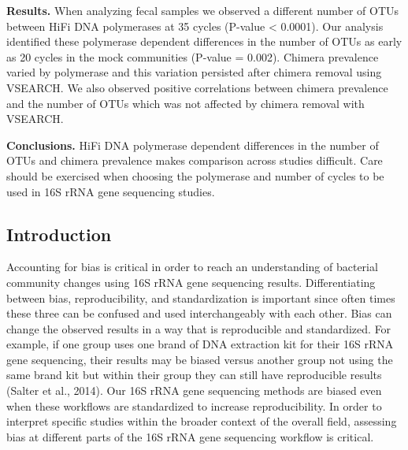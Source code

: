 \documentclass[12pt,]{article}
\begin{document}
\textbf{Results.} When analyzing fecal samples we observed a different
number of OTUs between HiFi DNA polymerases at 35 cycles (P-value
\textless{} 0.0001). Our analysis identified these polymerase dependent
differences in the number of OTUs as early as 20 cycles in the mock
communities (P-value = 0.002). Chimera prevalence varied by polymerase
and this variation persisted after chimera removal using VSEARCH. We
also observed positive correlations between chimera prevalence and the
number of OTUs which was not affected by chimera removal with VSEARCH.

\textbf{Conclusions.} HiFi DNA polymerase dependent differences in the
number of OTUs and chimera prevalence makes comparison across studies
difficult. Care should be exercised when choosing the polymerase and
number of cycles to be used in 16S rRNA gene sequencing studies.

\newpage

\subsection{Introduction}\label{introduction}

Accounting for bias is critical in order to reach an understanding of
bacterial community changes using 16S rRNA gene sequencing results.
Differentiating between bias, reproducibility, and standardization is
important since often times these three can be confused and used
interchangeably with each other. Bias can change the observed results in
a way that is reproducible and standardized. For example, if one group
uses one brand of DNA extraction kit for their 16S rRNA gene sequencing,
their results may be biased versus another group not using the same
brand kit but within their group they can still have reproducible
results (Salter et al., 2014). Our 16S rRNA gene sequencing methods are
biased even when these workflows are standardized to increase
reproducibility. In order to interpret specific studies within the
broader context of the overall field, assessing bias at different parts
of the 16S rRNA gene sequencing workflow is critical.
\end{document}
